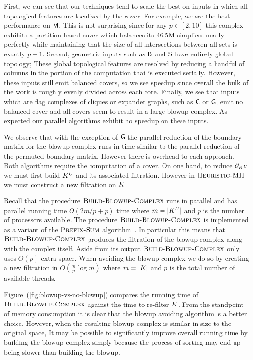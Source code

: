 First, we can see that our techniques tend to scale the best on inputs
in which all topological features are localized by the cover. For example, we see the
best performance on $\textsf{M}$. This is not surprising since for any $p \in [2, 10]$ 
this complex exhibits a partition-based cover which balances its 
46.5M simplices nearly perfectly while maintaining that the size of all intersections between all sets is exactly $p-1$.
Second, geometric inputs such as ${\textsf{B}}$ and $\textsf{S}$ have entirely global topology; These
global topological features are resolved by reducing a handful of columns in the portion of the computation that is 
executed serially. However, these inputs still emit balanced covers, so we see speedup since 
overall the bulk of the work is roughly evenly divided across each core.
Finally, we see that inputs which are flag complexes of cliques or expander graphs, 
such as $\textsf{C}$ or $\textsf{G}$, emit no balanced cover and all covers seem to result in a large blowup complex. 
As expected our parallel algorithms exhibit no speedup on these inputs. 


We observe that with the exception of $\textsf{G}$ the parallel reduction of the boundary matrix for the blowup complex 
runs in time similar to the parallel reduction of the permuted boundary matrix. However there is overhead to each approach. 
Both algorithms require the computation of a cover. On one hand, to reduce $\partial_{K^U}$ we must first build $K^U$ and its associated filtration. 
However in $\textnormal{\scshape Heuristic-MH}$ we must construct a new filtration on $K$. 

Recall that the procedure $\textnormal{\scshape Build-Blowup-Complex}$ runs in parallel and has parallel running time $O(2m/p + p)$ time where $m = |K^{U}|$ 
and $p$ is the number of processors available. 
The procedure $\textnormal{\scshape Build-Blowup-Complex}$ is implemented as a variant of the $\textnormal{\scshape Prefix-Sum}$ algorithm~\cite{breshears}. 
In particular this means that $\textnormal{\scshape Build-Blowup-Complex}$ produces the filtration of the blowup complex along with the complex itself. 
Aside from its output $\textnormal{\scshape Build-Blowup-Complex}$ only uses $O(p)$ extra space. When avoiding the blowup complex we 
do so by creating a new filtration in $O(\frac{m}{p}\log{m})$ where $m = |K|$ and $p$ is the total number of available threads.

Figure~(\ref{fig:blowup-vs-no-blowup}) compares the running time of $\textnormal{\scshape Build-Blowup-Complex}$ against the time to re-filter $K$.
From the standpoint of memory consumption it is clear that the blowup avoiding algorithm is a better choice. However,
when the resulting blowup complex is similar in size to the original space, It may be possible to significantly improve overall running time 
by building the blowup complex simply because the process of sorting may end up being slower than building the blowup.

